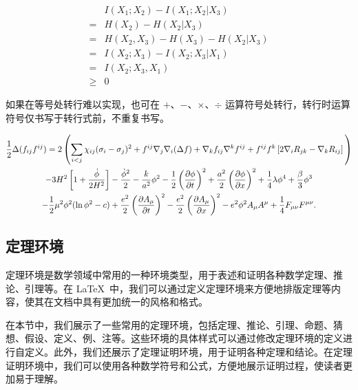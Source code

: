 \begin{align}
       & I(X_1;X_2)-I(X_1;X_2|X_3) \nonumber    \\
  =    & H(X_2)-H(X_2|X_3) \nonumber            \\
  =    & H(X_2,X_3)-H(X_3)-H(X_2|X_3) \nonumber \\
  =    & I(X_2;X_3)-I(X_2;X_3|X_1) \nonumber    \\
  =    & I(X_2;X_3,X_1) \nonumber               \\
  \geq & 0
\end{align}

如果在等号处转行难以实现，也可在 $+$、$-$、$\times$、$\div$ 运算符号处转行，转行时运算符号仅书写于转行式前，不重复书写。

\begin{multline}
  \frac{1}{2} \Delta (f_{ij} f^{ij}) =
  2 \left(\sum_{i<j} \chi_{ij}(\sigma_{i} - \sigma_{j})^{2}
  + f^{ij} \nabla_{j} \nabla_{i} (\Delta f)  + \nabla_{k} f_{ij} \nabla^{k} f^{ij} +
  f^{ij} f^{k} \left[2\nabla_{i}R_{jk}- \nabla_{k} R_{ij} \right] \vphantom{\sum_{i<j}} \right) \\
  - 3H^{2}\left[1+\frac{\dot{\phi}}{2H^2}\right] - \frac{\dot{\phi}^{2}}{2} - \frac{k}{a^{2}}\phi^{2} - \frac{1}{2}\left(\frac{\partial\phi}{\partial t}\right)^{2} + \frac{a^2}{2}\left(\frac{\partial\phi}{\partial x}\right)^{2}
  + \frac{1}{4}\lambda\phi^{4} + \frac{\beta}{3}\phi^{3} \\
  -\frac{1}{2}\mu^{2}\phi^{2}(\ln{\phi^{2}} - c)
  + \frac{e^{2}}{2}\left(\frac{\partial A_{\mu}}{\partial t}\right)^{2} - \frac{e^{2}}{2}\left(\frac{\partial A_{\mu}}{\partial x}\right)^{2}
  - e^{2}\phi^{2}A_{\mu}A^{\mu} + \frac{1}{4}F_{\mu\nu}F^{\mu\nu}.
\end{multline}

\subsection{定理环境}

定理环境是数学领域中常用的一种环境类型，用于表述和证明各种数学定理、推论、引理等。在 \LaTeX\ 中，我们可以通过定义定理环境来方便地排版定理等内容，使其在文档中具有更加统一的风格和格式。

在本节中，我们展示了一些常用的定理环境，包括定理、推论、引理、命题、猜想、假设、定义、例、注等。这些环境的具体样式可以通过修改定理环境的定义进行自定义。此外，我们还展示了定理证明环境，用于证明各种定理和结论。在定理证明环境中，我们可以使用各种数学符号和公式，方便地展示证明过程，使读者更加易于理解。

